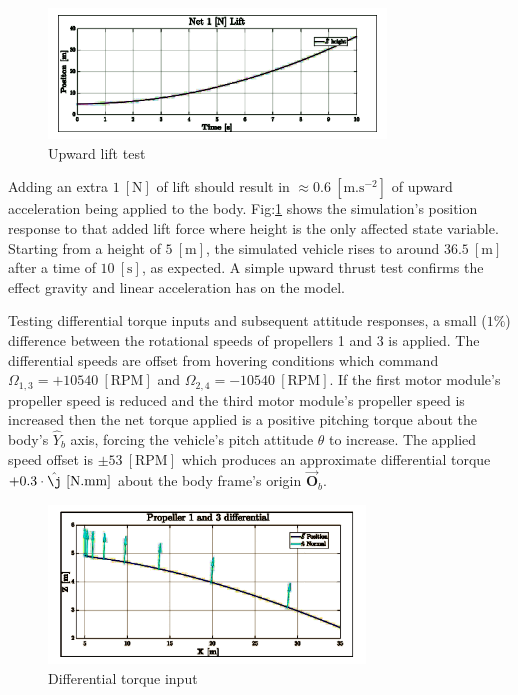 \begin{figure}[hbtp]
\vspace{-12pt}
\centering
\includegraphics[width=0.8\textwidth]{graphs/upward_acceleration}
\vspace{-10pt}
\caption{Upward lift test}
\label{fig:upward_accl}
\end{figure}
\par
Adding an extra $1~[\text{N}]$ of lift should result in $\approx 0.6~[\text{m.s}^{-2}]$ of upward acceleration being applied to the body. Fig:\ref{fig:upward_accl} shows the simulation's position response to that added lift force where height is the only affected state variable. Starting from a height of $5~[\text{m}]$, the simulated vehicle rises to around $36.5~[\text{m}]$ after a time of $10~[\text{s}]$, as expected. A simple upward thrust test confirms the effect gravity and linear acceleration has on the model.
\par
Testing differential torque inputs and subsequent attitude responses, a small ($1\%$) difference between the rotational speeds of propellers 1 and 3 is applied. The differential speeds are offset from hovering conditions which command $\Omega_{1,3}=+10540~[\text{RPM}]$ and $\Omega_{2,4}=-10540~[\text{RPM}]$. If the first motor module's propeller speed is reduced and the third motor module's propeller speed is increased then the net torque applied is a positive pitching torque about the body's $\hat{Y}_b$ axis, forcing the vehicle's pitch attitude $\theta$ to increase. The applied speed offset is $\pm 53~[\text{RPM}]$ which produces an approximate differential torque $+0.3\cdot\hat{\j}~[\text{N.mm}]$ about the body frame's origin $\vec{\mathbf{O}}_b$. 
\begin{figure}[htbp]
\vspace{-8pt}
\centering
\includegraphics[width=0.75\textwidth]{graphs/propeller_differential}
\vspace{-6pt}
\caption{Differential torque input}
\label{fig:differential_prop}
\vspace{-10pt}
\end{figure}
